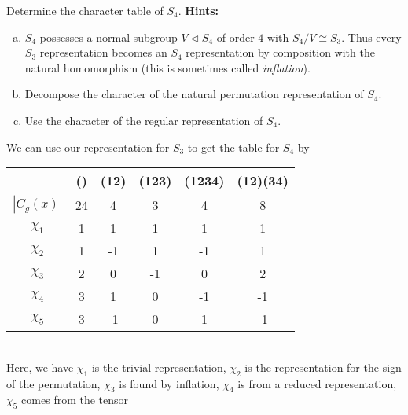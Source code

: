 \documentclass[leqno]{article}
\begin{document}
\newpage
\begin{problem}
Determine the character table of $S_4$. \textbf{Hints:}
\begin{enumerate}[(a)]
    \item $S_4$ possesses a normal subgroup $V\triangleleft S_4$ of order $4$ with $S_4/V\cong S_3$. Thus every $S_3$ representation becomes an $S_4$ representation by composition with the natural homomorphism (this is sometimes called \emph{inflation}).
    \item Decompose the character of the natural permutation representation of $S_4$.
    \item Use the character of the regular representation of $S_4$.
\end{enumerate}
\end{problem}
\begin{solution}
    We can use our representation for $S_3$ to get the table for $S_4$ by\\
    
    \begin{tabular}{c|ccccc}
        ~ & () & (12) & (123) & (1234) & (12)(34) \\
        \hline
        $|C_g(x)|$ & 24 & 4 & 3 & 4 & 8\\
        $\chi_1$ & 1 & 1 & 1 & 1 & 1\\
        $\chi_2$ & 1 & -1 & 1 & -1 & 1\\
        $\chi_3$ & 2 & 0 & -1 & 0 & 2\\
        $\chi_4$ & 3 & 1 & 0 & -1 & -1\\
        $\chi_5$ & 3 & -1 & 0 & 1 & -1
    \end{tabular}\\
    
    Here, we have $\chi_1$ is the trivial representation, $\chi_2$ is the representation for the sign of the permutation, $\chi_3$ is found by inflation, $\chi_4$ is from a reduced representation, $\chi_5$ comes from the tensor 
\end{solution}
\end{document}
